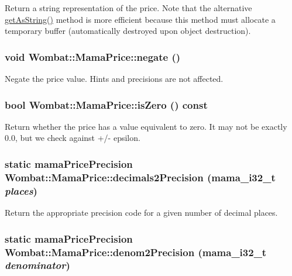 Return a string representation of the price. Note that the alternative \hyperlink{classWombat_1_1MamaPrice_ae735ce0fedcead944050df2460ef33a0}{getAsString()} method is more efficient because this method must allocate a temporary buffer (automatically destroyed upon object destruction). \hypertarget{classWombat_1_1MamaPrice_a8352d77ec2751d6002395c5c3a153323}{
\subsubsection[{negate}]{\setlength{\rightskip}{0pt plus 5cm}void Wombat::MamaPrice::negate ()}}
\label{classWombat_1_1MamaPrice_a8352d77ec2751d6002395c5c3a153323}


Negate the price value. Hints and precisions are not affected. \hypertarget{classWombat_1_1MamaPrice_ae691b4520967f5112c561684cefdc58a}{
\subsubsection[{isZero}]{\setlength{\rightskip}{0pt plus 5cm}bool Wombat::MamaPrice::isZero () const}}
\label{classWombat_1_1MamaPrice_ae691b4520967f5112c561684cefdc58a}


Return whether the price has a value equivalent to zero. It may not be exactly 0.0, but we check against +/-\/ epsilon. \hypertarget{classWombat_1_1MamaPrice_af667f9cbdc3d59231cd8d106ba76063f}{
\subsubsection[{decimals2Precision}]{\setlength{\rightskip}{0pt plus 5cm}static mamaPricePrecision Wombat::MamaPrice::decimals2Precision (mama\_\-i32\_\-t {\em places})}}
\label{classWombat_1_1MamaPrice_af667f9cbdc3d59231cd8d106ba76063f}


Return the appropriate precision code for a given number of decimal places. \hypertarget{classWombat_1_1MamaPrice_ae2b01c3e29fe9621e2d3ad61b598f4ff}{
\subsubsection[{denom2Precision}]{\setlength{\rightskip}{0pt plus 5cm}static mamaPricePrecision Wombat::MamaPrice::denom2Precision (mama\_\-i32\_\-t {\em denominator})}}
\label{classWombat_1_1MamaPrice_ae2b01c3e29fe9621e2d3ad61b598f4ff}


